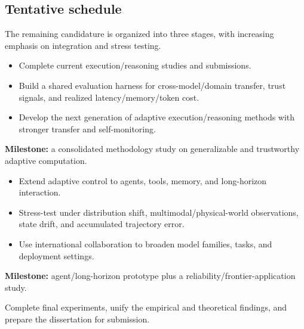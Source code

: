 \documentclass[12pt,a4paper]{article}
\begin{document}
\subsection{Tentative schedule}
The remaining candidature is organized into three stages, with increasing emphasis on integration and stress testing.

\begin{tcolorbox}[colback=SoftBlue!50,colframe=NTUblue!55,boxrule=.45pt,arc=1.5pt,title={\textbf{Stage I -- Consolidate and generalize} \hfill \textnormal{Sep 2026--Jun 2027}}]
\begin{itemize}[leftmargin=1.25em]
\item Complete current execution/reasoning studies and submissions.
\item Build a shared evaluation harness for cross-model/domain transfer, trust signals, and realized latency/memory/token cost.
\item Develop the next generation of adaptive execution/reasoning methods with stronger transfer and self-monitoring.
\end{itemize}
\textbf{Milestone:} a consolidated methodology study on generalizable and trustworthy adaptive computation.
\end{tcolorbox}

\begin{tcolorbox}[colback=SoftTeal!65,colframe=Teal!58,boxrule=.45pt,arc=1.5pt,title={\textbf{Stage II -- Extend to frontier deployment} \hfill \textnormal{Jul 2027--Jun 2028}}]
\begin{itemize}[leftmargin=1.25em]
\item Extend adaptive control to agents, tools, memory, and long-horizon interaction.
\item Stress-test under distribution shift, multimodal/physical-world observations, state drift, and accumulated trajectory error.
\item Use international collaboration to broaden model families, tasks, and deployment settings.
\end{itemize}
\textbf{Milestone:} agent/long-horizon prototype plus a reliability/frontier-application study.
\end{tcolorbox}

\begin{tcolorbox}[colback=SoftGray,colframe=DarkGray!45,boxrule=.45pt,arc=1.5pt,title={\textbf{Stage III -- Integrate the dissertation} \hfill \textnormal{Jul--Aug 2028}}]
Complete final experiments, unify the empirical and theoretical findings, and prepare the dissertation for submission.
\end{tcolorbox}
\end{document}
